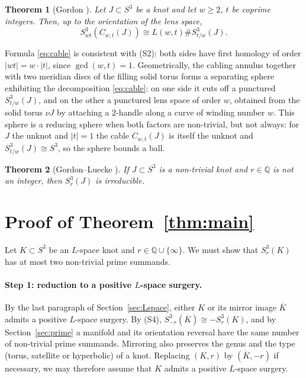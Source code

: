 \documentclass[11pt]{article}
\newcommand{\Q}{\mathbb Q}
\newcommand{\Surg}[2]{S^3_{#1}(#2)}
\newcommand{\nbd}{\nu}
\newtheorem{theorem}{Theorem}[section]
\theoremstyle{definition}
\theoremstyle{remark}
\begin{document}
\begin{theorem}[Gordon {\cite[Corollary~7.3]{Gordon1983}}]\label{thm:gordon}
Let \(J\subset S^3\) be a knot and let \(w\geq2\), \(t\) be coprime
integers. Then, up to the orientation of the lens space,
\begin{equation}\label{eq:cable}
 \Surg{wt}{C_{w,t}(J)}\cong L(w,t)\#\Surg{t/w}{J}.
\end{equation}
\end{theorem}

Formula \eqref{eq:cable} is consistent with (S2): both sides have first
homology of order \(|wt|=w\cdot|t|\), since \(\gcd(w,t)=1\). Geometrically,
the cabling annulus together with two meridian discs of the filling
solid torus forms a separating sphere exhibiting the decomposition
\eqref{eq:cable}: on one side it cuts off a punctured \(\Surg{t/w}{J}\),
and on the other a punctured lens space of order \(w\), obtained from
the solid torus \(\nbd J\) by attaching a \(2\)-handle along a curve of
winding number \(w\). This sphere is a reducing sphere when both factors
are non-trivial, but not always: for \(J\) the unknot and \(|t|=1\) the
cable \(C_{w,t}(J)\) is itself the unknot and \(\Surg{t/w}{J}\cong S^3\),
so the sphere bounds a ball.

\begin{theorem}[Gordon--Luecke {\cite{GordonLuecke1987}}]\label{thm:gl}
If \(J\subset S^3\) is a non-trivial knot and \(r\in\Q\) is not an
integer, then \(\Surg{r}{J}\) is irreducible.
\end{theorem}

\section{Proof of Theorem~\ref{thm:main}}\label{sec:proof}

Let \(K\subset S^3\) be an \(L\)-space knot and \(r\in\Q\cup\{\infty\}\).
We must show that \(\Surg{r}{K}\) has at most two non-trivial prime
summands.

\paragraph{Step 1: reduction to a positive \(L\)-space surgery.}
By the last paragraph of Section~\ref{sec:Lspace}, either \(K\) or its
mirror image \(\overline K\) admits a positive \(L\)-space surgery. By (S4),
\(\Surg{-r}{\overline K}\cong-\Surg{r}{K}\), and by
Section~\ref{sec:prime} a manifold and its orientation reversal have the
same number of non-trivial prime summands. Mirroring also preserves the
genus and the type (torus, satellite or hyperbolic) of a knot. Replacing
\((K,r)\) by \((\overline K,-r)\) if necessary, we may therefore assume
that \(K\) admits a positive \(L\)-space surgery.
\end{document}
